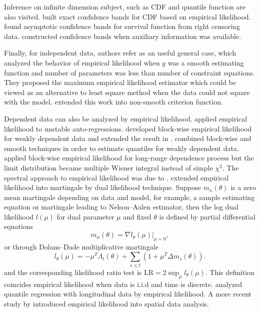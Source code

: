 Inference on infinite dimension subject, such as CDF and quantile
function are also visited. \citet{owen1995nonparametric} built exact
confidence bands for CDF based on empirical likelihood. \citet{hollander1997likelihood}
found asymptotic confidence bands for survival function from right
censoring data. \citet{zhang1996confidence,zhang1999bootstrapping}
constructed confidence bands when auxiliary information was available. 

Finally, for independent data, authors refer \citet{qin1994empirical}
as an useful general case, which analyzed the behavior of empirical
likelihood when $g$ was a smooth estimating function and number of
parameters was less than number of constraint equations. They proposed
the maximum empirical likelihood estimator which could be viewed as
an alternative to least square method when the data could not square
with the model. \citet{molanes2009empirical} extended this work into
non-smooth criterion function. 

Dependent data can also be analyzed by empirical likelihood. \citet{chuang2002empirical}
applied empirical likelihood to unstable auto-regressions. \citet{kitamura1997empirical}
developed block-wise empirical likelihood for weakly dependent data
and extended the result in \citet{qin1994empirical}. \citet{chen2009smoothed}
combined block-wise and smooth techniques in order to estimate quantiles
for weakly dependent data. \citet{nordman2007empirical} applied block-wise
empirical likelihood for long-range dependence process but the limit
distribution became multiple Wiener integral instead of simple $\chi^{2}$.
The spectral approach to empirical likelihood was due to \citet{monti1997empirical}.
\citet{mykland1995dual} extended empirical likelihood into martingale
by dual likelihood technique. Suppose $m_{n}\left(\theta\right)$
is a zero mean martingale depending on data and model, for example,
a sample estimating equation or martingale leading to Nelson--Aalen
estimator, then the log dual likelihood $l\left(\mu\right)$ for dual
parameter $\mu$ and fixed $\theta$ is defined by partial differential
equations 
\[
m_{n}\left(\theta\right)=\left.\nabla l_{\theta}\left(\mu\right)\right|_{\mu=0},
\]
 or through Dolans--Dade multiplicative martingale 
\[
l_{\theta}\left(\mu\right)=-\mu^{T}\Lambda_{t}\left(\theta\right)+\sum_{s\le t}\left(1+\mu^{T}\Delta m_{s}\left(\theta\right)\right).
\]
and the corresponding likelihood ratio test is $\mathrm{LR}=2\sup_{\mu}l_{\theta}\left(\mu\right)$.
This definition coincides empirical likelihood when data is i.i.d
and time is discrete. \citet{wang2011empirical} analyzed quantile
regression with longitudinal data by empirical likelihood. A more
recent study by \citet{bandyopadhyay2015frequency} introduced empirical
likelihood into spatial data analysis. 


